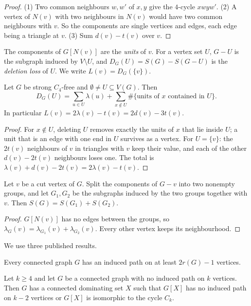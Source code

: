 \documentclass[ASNA]{USG}
\theoremstyle{WBstyletwo}
\numberwithin{equation}{section}
\begin{document}
\begin{proof}
(1) Two common neighbours $w,w'$ of $x,y$ give the $4$-cycle $xwyw'$. (2) A vertex of $N(v)$ with two neighbours in $N(v)$ would have two common neighbours with $v$. So the components are single vertices and edges, each edge being a triangle at $v$. (3) Sum $d(v)-t(v)$ over $v$.
\end{proof}

The components of $G[N(v)]$ are the \emph{units} of $v$. For a vertex set $U$, $G-U$ is the subgraph induced by $V\setminus U$, and $D_G(U)=S(G)-S(G-U)$ is the \emph{deletion loss} of $U$. We write $L(v)=D_G(\{v\})$.

\begin{lemma}\label{lem:loss}
Let $G$ be strong $C_4$-free and $\emptyset\ne U\subseteq V(G)$. Then
\[
D_G(U)=\sum_{u\in U}\lambda(u)+\sum_{x\notin U}\#\{\text{units of }x\text{ contained in }U\}.
\]
In particular $L(v)=2\lambda(v)-t(v)=2d(v)-3t(v)$.
\end{lemma}

\begin{proof}
For $x\notin U$, deleting $U$ removes exactly the units of $x$ that lie inside $U$; a unit that is an edge with one end in $U$ survives as a vertex. For $U=\{v\}$: the $2t(v)$ neighbours of $v$ in triangles with $v$ keep their value, and each of the other $d(v)-2t(v)$ neighbours loses one. The total is $\lambda(v)+d(v)-2t(v)=2\lambda(v)-t(v)$.
\end{proof}

\begin{lemma}\label{lem:cut}
Let $v$ be a cut vertex of $G$. Split the components of $G-v$ into two nonempty groups, and let $G_1,G_2$ be the subgraphs induced by the two groups together with $v$. Then $S(G)=S(G_1)+S(G_2)$.
\end{lemma}

\begin{proof}
$G[N(v)]$ has no edges between the groups, so $\lambda_G(v)=\lambda_{G_1}(v)+\lambda_{G_2}(v)$. Every other vertex keeps its neighbourhood.
\end{proof}

We use three published results.

\begin{theorem}\label{thm:ess}
Every connected graph $G$ has an induced path on at least $2r(G)-1$ vertices.
\end{theorem}

\begin{theorem}\label{thm:cs}
Let $k\ge 4$ and let $G$ be a connected graph with no induced path on $k$ vertices. Then $G$ has a connected dominating set $X$ such that $G[X]$ has no induced path on $k-2$ vertices or $G[X]$ is isomorphic to the cycle $C_k$.
\end{theorem}
\end{document}
